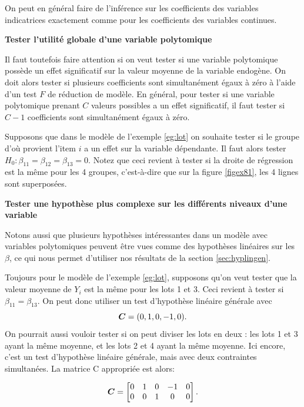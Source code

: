 On peut en général faire de l'inférence sur les coefficients des variables indicatrices exactement comme pour les coefficients des variables continues.

\textbf{Tester l'utilité globale d'une variable polytomique}

Il faut toutefois faire attention si on veut tester si une variable polytomique possède un effet significatif
sur la valeur moyenne de la variable endogène. On doit alors tester si
plusieurs coefficients sont simultanément égaux à zéro à
l'aide d'un test $F$ de réduction de modèle. En général, pour tester si une variable polytomique prenant
$C$ valeurs possibles a un effet significatif, il faut tester si
$C-1$ coefficients sont simultanément égaux à zéro.

\begin{exemple}
Supposons que dans le modèle de l'exemple \ref{eg:lot} on souhaite tester si le groupe
d'o\`u provient l'item $i$ a un effet sur la variable dépendante. Il faut alors tester $H_0:\beta_{11}=\beta_{12}=\beta_{13}=0$. Notez que ceci revient à tester si la droite de régression est la m\^eme pour les 4 groupes, c'est-à-dire que sur la figure
\ref{figex81}, les 4 lignes sont superposées.
\end{exemple}

\textbf{Tester une hypothèse plus complexe sur les différents niveaux d'une variable}


Notons aussi que plusieurs hypothèses intéressantes dans un modèle avec variables polytomiques peuvent \^etre vues comme des hypothèses linéaires sur les $\beta$, ce qui nous permet d'utiliser nos résultats de la section \ref{sec:hyplingen}.

\begin{exemple}
Toujours pour le modèle de l'exemple \ref{eg:lot}, supposons qu'on veut tester que la valeur moyenne de $Y_i$ est la m\^eme pour les lots 1 et 3. Ceci revient à tester si $\beta_{11} = \beta_{13}$. On peut donc utiliser un test d'hypothèse linéaire générale avec $${\bm{C}} = (0,1,0,-1,0).$$
On pourrait aussi vouloir tester si on peut diviser les lots en deux : les lots 1 et 3 ayant la même moyenne, et les lots 2 et 4 ayant la même moyenne. Ici encore, c'est un test d'hypothèse linéaire générale, mais avec deux contraintes simultanées. La matrice C appropriée est alors:

$$ {\bm{C}}  =
\begin{bmatrix}
    0 & 1 & 0 & -1 & 0 \\
    0 & 0 & 1 & 0 & 0
\end{bmatrix}.
$$
\end{exemple}




